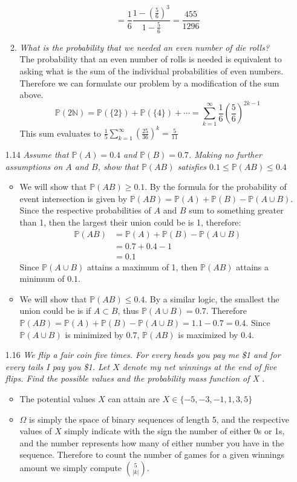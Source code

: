 \documentclass[12pt, letterpaper]{article}
\newcommand{\N}{\mathbb{N}}
\newcommand{\Pro}{\mathbb{P}}
\begin{document}
\begin{enumerate}
\begin{enumerate}
$$		= \frac{1}{6}\frac{1-(\frac{5}{6})^3}{1-\frac{5}{6}}
		= \frac{455}{1296}
		$$
		\item \textit{What is the probability that we needed an even number of die rolls?}\\
		The probability that an even number of rolls is needed is equivalent to 
		asking what is the sum of the individual probabilities of even numbers.
		Therefore we can formulate our problem by a modification of the sum above.
		$$
		\Pro (2\N) = \Pro(\{2\}) + \Pro(\{4\}) + \cdots  = \sum_{k=1}^\infty \frac{1}{6} (\frac{5}{6})^{2k-1}
		$$
		This sum evaluates to $\frac{1}{5}\sum_{k=1}^\infty (\frac{25}{36})^k = \frac{5}{11}$
	\end{enumerate}
	\item[1.14] \textit{Assume that $\Pro(A) = 0.4$ and $\Pro(B) = 0.7$. Making no further
assumptions on $A$ and $B$, show that $\Pro(AB)$ satisfies $0.1 \leq \Pro(AB) \leq 0.4$}
	\begin{itemize}
		\item We will show that $\Pro(AB) \geq 0.1$.  By the formula for the probability of event intersection is given by $\Pro(AB) = \Pro(A) + \Pro(B) - \Pro(A \cup B)$.  Since the respective probabilities of $A$ and $B$ sum to something greater than 1, then the largest their union could be is 1, therefore:
		\begin{align*}
			\Pro(AB) &= \Pro(A) + \Pro(B) - \Pro(A \cup B)\\
				&= 0.7 + 0.4 - 1\\
				&= 0.1
		\end{align*}
		Since $\Pro(A \cup B)$ attains a maximum of 1, then $\Pro(AB)$ attains a minimum of $0.1$.  
		\item We will show that $\Pro(AB) \leq 0.4$.  By a similar logic, the smallest the union could be is if $A \subset B$, thus $\Pro(A \cup B) = 0.7$.
		Therefore $\Pro(AB) = \Pro(A) + \Pro(B) - \Pro(A \cup B) = 1.1 -0.7 = 0.4$.  Since $\Pro(A \cup B)$ is minimized by $0.7$, $\Pro(AB)$ is maximized by $0.4$.  
\end{itemize}
	\item[1.16] \textit{We flip a fair coin five times. For every heads you pay me
\$1 and for every tails I pay you \$1. Let $X$ denote my net winnings at the
end of five flips. Find the possible values and the probability mass function
of X .}	 
	\begin{itemize}
		\item The potential values $X$ can attain are $X \in \{-5, -3, -1, 1, 3, 5\}$
		\item $\Omega$ is simply the space of binary sequences of length 5, and the respective values of $X$ simply indicate with the sign the number of either 0s or 1s, and the number represents how many of either number you have in the sequence.  Therefore to count the number of games for a given winnings amount we simply compute $\binom{5}{|k|}$. 

\end{itemize}
\end{enumerate}
\end{document}
